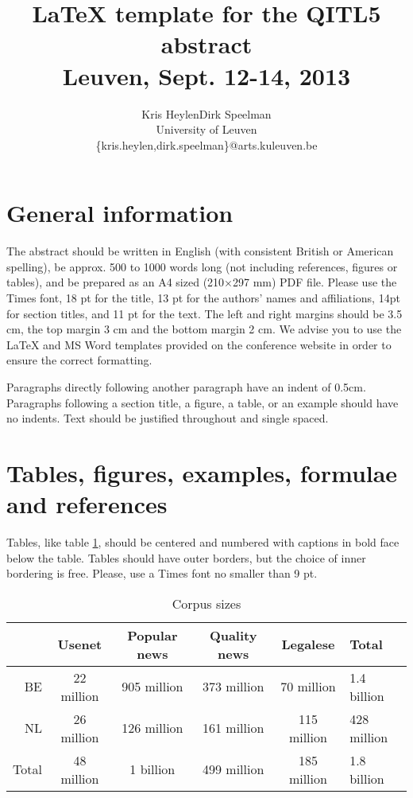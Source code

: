 \documentclass[11pt,a4paper]{article}
\begin{document}
\thispagestyle{empty}

\title{\textbf{{\LaTeX} template for the QITL5 abstract \\ Leuven, Sept. 12-14, 2013}}
\author{Kris Heylen\quad Dirk Speelman\\
University of Leuven\\
\{kris.heylen,dirk.speelman\}@arts.kuleuven.be}

\date{} %
\maketitle\thispagestyle{empty} %

\section{General information}
The abstract should be written in English (with consistent British or American spelling), be approx. 500 to 1000 words long (not including references, figures or tables), and  be prepared as an A4 sized  (210$\times$297 mm) PDF file. Please use the Times font, 18 pt for the title, 13 pt for the authors' names and affiliations, 14pt for section titles, and 11 pt for the text. The left and right margins should be 3.5 cm, the top margin 3 cm and the bottom margin 2 cm.  We advise you to use the {\LaTeX} and MS Word templates provided on the conference website in order to ensure the correct formatting.

Paragraphs directly following another paragraph have an indent of 0.5cm. Paragraphs following a section title, a figure, a table, or an example should have no indents. Text should be justified throughout and  single spaced.


\section{Tables, figures, examples, formulae and references}

Tables, like table \ref{tab:corpussizes}, should be centered and numbered with captions in bold face below the table. Tables should have outer borders, but the choice of inner bordering is free. Please, use a Times font no smaller than 9 pt.

\begin{table}[htbp]
\centering
\small
\begin{tabular}{|r|cccc|l|}
\hline
    & Usenet     & Popular news & Quality news & Legalese    & Total\\
\hline
BE    & 22 million & 905 million        & 373 million        & 70 million  & 1.4 billion\\
NL    & 26 million & 126 million        & 161 million        & 115 million & 428 million\\
\hline
Total & 48 million & 1 billion          & 499 million        & 185 million & 1.8 billion\\
\hline
\end{tabular}
{\bf \caption{Corpus sizes}
\label{tab:corpussizes}}
\end{table}
\end{document}
